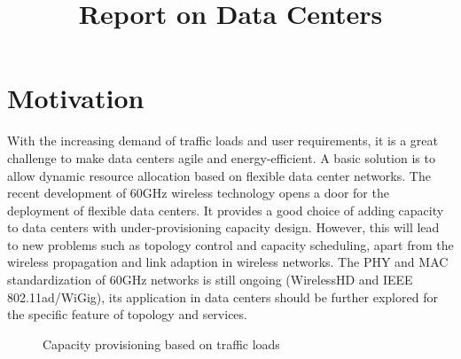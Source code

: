 \documentclass[journal,onecolumn,11pt]{IEEEtran}
\title{Report on Data Centers}
\author{\IEEEauthorblockN{Yongsen MA}
}
\begin{document}
\maketitle%

\section{Motivation}

With the increasing demand of traffic loads and user requirements, it is a great challenge to make data centers agile and energy-efficient. A basic solution is to allow dynamic resource allocation based on flexible data center networks. The recent development of 60GHz wireless technology opens a door for the deployment of flexible data centers. It provides a good choice of adding capacity to data centers with under-provisioning capacity design. However, this will lead to new problems such as topology control and capacity scheduling, apart from the wireless propagation and link adaption in wireless networks. The PHY and MAC standardization of 60GHz networks is still ongoing (WirelessHD and IEEE 802.11ad/WiGig), its application in data centers should be further explored for the specific feature of topology and services.

\begin{figure}[!htp]
\centerline{
}
\caption{Capacity provisioning based on traffic loads}
\label{provisioning}
\end{figure}
\end{document}
